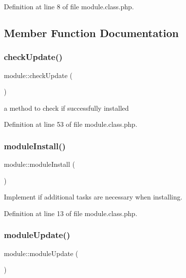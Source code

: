Definition at line 8 of file module.\+class.\+php.



\subsection{Member Function Documentation}
\hypertarget{classmodule_a357cb59a36a3aa94003882c8256c038e}{}\label{classmodule_a357cb59a36a3aa94003882c8256c038e} 
\subsubsection{\texorpdfstring{check\+Update()}{checkUpdate()}}
{\footnotesize\ttfamily module\+::check\+Update (\begin{DoxyParamCaption}{ }\end{DoxyParamCaption})}



a method to check if successfully installed 



Definition at line 53 of file module.\+class.\+php.

\hypertarget{classmodule_a7b8280dacfb107bdea9440e4a4cf42f0}{}\label{classmodule_a7b8280dacfb107bdea9440e4a4cf42f0} 
\subsubsection{\texorpdfstring{module\+Install()}{moduleInstall()}}
{\footnotesize\ttfamily module\+::module\+Install (\begin{DoxyParamCaption}{ }\end{DoxyParamCaption})}



Implement if additional tasks are necessary when installing. 



Definition at line 13 of file module.\+class.\+php.

\hypertarget{classmodule_aa71624e39c27ab5c362b8b1623b36ec4}{}\label{classmodule_aa71624e39c27ab5c362b8b1623b36ec4} 
\subsubsection{\texorpdfstring{module\+Update()}{moduleUpdate()}}
{\footnotesize\ttfamily module\+::module\+Update (\begin{DoxyParamCaption}{ }\end{DoxyParamCaption})}



